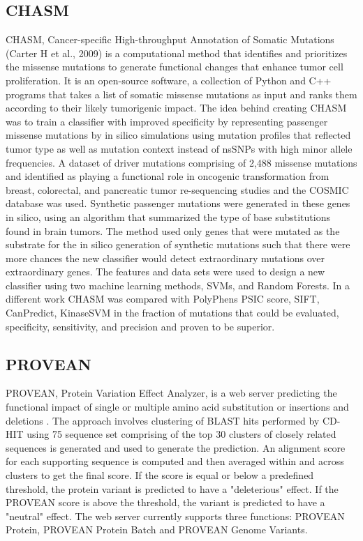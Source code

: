 \documentclass{article}
\begin{document}
\subsection{CHASM}

CHASM, Cancer-specific High-throughput Annotation of Somatic Mutations
(Carter H et al., 2009) is a computational method that identifies and
prioritizes the missense mutations to generate functional changes that
enhance tumor cell proliferation. It is an open-source software, a
collection of Python and C++ programs that takes a list of somatic
missense mutations as input and ranks them according to their likely
tumorigenic impact. The idea behind creating CHASM was to train a
classifier with improved specificity by representing passenger
missense mutations by in silico simulations using mutation profiles
that reflected tumor type as well as mutation context instead of
nsSNPs with high minor allele frequencies. A dataset of driver
mutations comprising of 2,488 missense mutations and identified as
playing a functional role in oncogenic transformation from breast,
colorectal, and pancreatic tumor re-sequencing studies and the COSMIC
database was used. Synthetic passenger mutations were generated in
these genes in silico, using an algorithm that summarized the type of
base substitutions found in brain tumors. The method used only genes
that were mutated as the substrate for the in silico generation of
synthetic mutations such that there were more chances the new
classifier would detect extraordinary mutations over extraordinary
genes. The features and data sets were used to design a new classifier
using two machine learning methods, SVMs, and Random Forests. In a
different work CHASM was compared with PolyPhens PSIC score, SIFT,
CanPredict, KinaseSVM in the fraction of mutations that could be
evaluated, specificity, sensitivity, and precision and proven to be
superior.

\subsection{PROVEAN}

PROVEAN, Protein Variation Effect Analyzer, is a
web server predicting the functional impact of single or multiple
amino acid substitution or insertions and deletions
\cite{Choi2012-tk}. The approach involves clustering of BLAST hits
performed by CD-HIT using 75%
sequence set comprising of the top 30 clusters of closely related
sequences is generated and used to generate the prediction. An
alignment score for each supporting sequence is computed and then
averaged within and across clusters to get the final score. If the
score is equal or below a predefined threshold, the protein variant is
predicted to have a "deleterious" effect. If the PROVEAN score is
above the threshold, the variant is predicted to have a "neutral"
effect. The web server currently supports three functions: PROVEAN
Protein, PROVEAN Protein Batch and PROVEAN Genome Variants.
\end{document}
